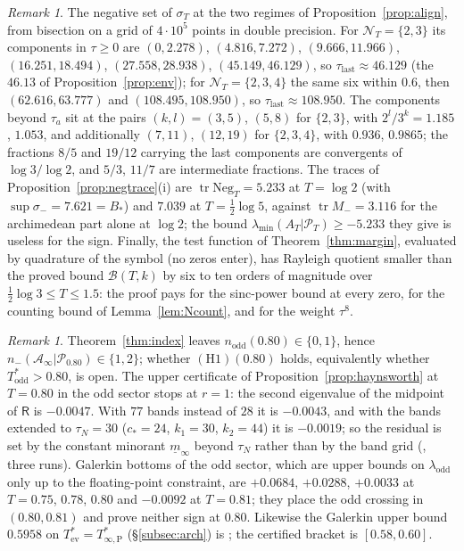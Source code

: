 \documentclass[11pt]{amsart}
\theoremstyle{definition}
\theoremstyle{remark}
\newtheorem{remark}[theorem]{Remark}
\newcommand{\PT}{\mathcal P_T}
\newcommand{\lamA}{\lambda_{\min}(A_T|\PT)}
\newcommand{\sT}{\sigma_T}
\newcommand{\NT}{\mathcal N_T}
\newcommand{\Ainf}{\mathcal A_\infty}
\begin{document}
\begin{remark}\label{rem:bandtable}
The negative set of $\sT$ at the two regimes of Proposition~\ref{prop:align}, from bisection on a grid of
$4\cdot10^5$ points in double precision. For $\NT=\{2,3\}$ its components in $\tau\ge0$ are
$(0,2.278)$, $(4.816,7.272)$, $(9.666,11.966)$, $(16.251,18.494)$, $(27.558,28.938)$, $(45.149,46.129)$,
so $\tau_{\mathrm{last}}\approx46.129$ (the $46.13$ of Proposition~\ref{prop:env}); for $\NT=\{2,3,4\}$ the same
six within $0.6$, then $(62.616,63.777)$ and $(108.495,108.950)$, so $\tau_{\mathrm{last}}\approx108.950$. The
components beyond $\tau_a$ sit at the pairs $(k,l)=(3,5)$, $(5,8)$ for $\{2,3\}$, with $2^l/3^k=1.185$, $1.053$,
and additionally $(7,11)$, $(12,19)$ for $\{2,3,4\}$, with $0.936$, $0.9865$; the fractions $8/5$ and $19/12$
carrying the last components are convergents of $\log3/\log2$, and $5/3$, $11/7$ are intermediate
fractions. The traces of Proposition~\ref{prop:negtrace}(i) are $\operatorname{tr}\mathrm{Neg}_T=5.233$ at $T=\log2$
(with $\sup\sigma_-=7.621=B_*$) and $7.039$ at $T=\frac12\log5$, against $\operatorname{tr}M_-=3.116$ for the
archimedean part alone at $\log2$; the bound $\lamA\ge-5.233$ they give is useless for the sign. Finally,
the test function of Theorem~\ref{thm:margin}, evaluated by quadrature of the symbol (no zeros enter), has
Rayleigh quotient smaller than the proved bound $\mathcal B(T,k)$ by six to ten orders of magnitude over
$\frac12\log3\le T\le1.5$: the proof pays for the sinc-power bound at every zero, for the counting bound
of Lemma~\ref{lem:Ncount}, and for the weight $\tau^8$.
\end{remark}

\begin{remark}\label{rem:odd080}
Theorem~\ref{thm:index} leaves $n_{\mathrm{odd}}(0.80)\in\{0,1\}$, hence $n_-(\Ainf|\mathcal P_{0.80})\in\{1,2\}$;
whether $(\mathrm{H1})(0.80)$ holds, equivalently whether $T^*_{\mathrm{odd}}>0.80$, is open. The upper
certificate of Proposition~\ref{prop:haynsworth} at $T=0.80$ in the odd sector stops at $r=1$: the second
eigenvalue of the midpoint of $\mathsf R$ is $-0.0047$. With $77$ bands instead of $28$ it is $-0.0043$,
and with the bands extended to $\tau_N=30$ ($c_*=24$, $k_1=30$, $k_2=44$) it is $-0.0019$; so the residual
is set by the constant minorant $\underline m_\infty$ beyond $\tau_N$ rather than by the band grid
(, three runs). Galerkin bottoms of the odd sector, which are upper bounds on
$\lambda_{\mathrm{odd}}$ only up to the floating-point constraint, are $+0.0684$, $+0.0288$, $+0.0033$ at
$T=0.75$, $0.78$, $0.80$ and $-0.0092$ at $T=0.81$; they place the odd crossing in $(0.80,0.81)$ and prove
neither sign at $0.80$. Likewise the Galerkin upper bound $0.5958$ on $T^*_{\mathrm{ev}}=T^*_{\infty,\mathrm P}$
(\S\ref{subsec:arch}) is ; the certified bracket is $[0.58,0.60]$.
\end{remark}
\end{document}
